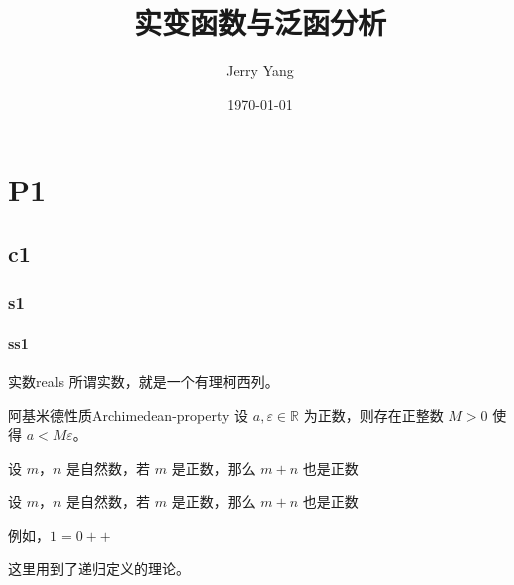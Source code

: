 \documentclass[color=plain, cn]{elegantbook}
\title{实变函数与泛函分析}
\author{Jerry Yang}
\date{\today}
\institute{Southeast University, Nanjing, China}
\begin{document}
\maketitle
\tableofcontents
\part{P1}
\chapter{c1}
\section{s1}
\subsection{ss1}

\begin{definition}{实数}{reals}
	所谓实数，就是一个有理柯西列。
\end{definition}


\begin{theorem}{阿基米德性质}{Archimedean-property}
	设 $a,\varepsilon \in \mathbb R$ 为正数，则存在正整数 $M > 0$ 使得 $a < M\varepsilon$。
\end{theorem}


\begin{proposition}{}{}
	设 $m$，$n$ 是自然数，若 $m$ 是正数，那么 $m+n$ 也是正数
\end{proposition}


\begin{proposition}{}{}
	设 $m$，$n$ 是自然数，若 $m$ 是正数，那么 $m+n$ 也是正数
\end{proposition}

\begin{example}
	例如，$1 = 0++$
\end{example}


\begin{note}
	这里用到了递归定义的理论。
\end{note}
\end{document}
